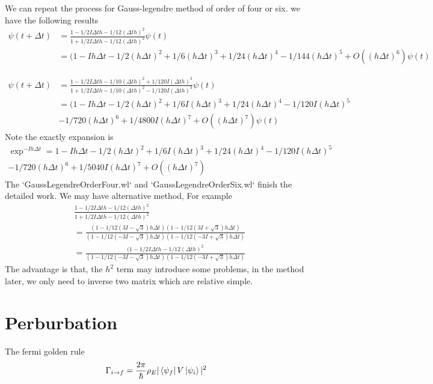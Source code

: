 \documentclass[12pt,twoside]{article}
\begin{document}
We can repeat the process for Gauss-legendre method of order of four or six. we have the following results
\begin{align*}
\psi(t + \Delta t) &= \frac{1 - 1/2 I \Delta t h - 1/12 (\Delta t h)^2}{ 1 + 1/2 I \Delta t h - 1/12 (\Delta t h)^2} \psi(t)\\
&=(1 - I h \Delta t - 1/2 (h \Delta t)^2 + 1/6 (h \Delta t)^3 + 1/24(h \Delta t)^4 - 1/144(h \Delta t)^5 + O((h \Delta t)^6)\psi(t)
\end{align*}

\begin{align*}
\psi(t + \Delta t) &= \frac{1 - 1/2 I \Delta t h - 1/10 (\Delta t h)^2 + 1/120 I (\Delta t h)^3}{ 1 + 1/2 I \Delta t h - 1/10 (\Delta t h)^2 - 1/120 I (\Delta t h)^3} \psi(t)\\
&=(1 - I h \Delta t - 1/2 (h \Delta t)^2 + 1/6 I(h \Delta t)^3 + 1/24(h \Delta t)^4 - 1/120I(h \Delta t)^5\\
&-1/720(h \Delta t)^6 + 1/4800I(h \Delta t)^7+ O((h \Delta t)^7)\psi(t)
\end{align*}
Note the exactly expansion is
\begin{multline}
\exp^{-Ih\Delta t} = 1 - I h \Delta t - 1/2 (h \Delta t)^2 + 1/6 I(h \Delta t)^3 + 1/24(h \Delta t)^4 - 1/120I(h \Delta t)^5\\
-1/720(h \Delta t)^6 + 1/5040I(h \Delta t)^7+ O((h \Delta t)^7)
\end{multline}
The `GaussLegendreOrderFour.wl` and  `GaussLegendreOrderSix.wl` finish the detailed work.
We may have alternative method, For example
\begin{align*}
&\frac{1 - 1/2 I \Delta t h - 1/12 (\Delta t h)^2}{ 1 + 1/2 I \Delta t h - 1/12 (\Delta t h)^2}\\
&=\frac{(1-1/12(3I-\sqrt{3})h \Delta t)(1-1/12(3I+\sqrt{3})h \Delta t)}{(1-1/12(-3I-\sqrt{3})h \Delta t)(1-1/12(-3I+\sqrt{3})h \Delta t)}\\
&=\frac{(1 - 1/2 I \Delta t h - 1/12 (\Delta t h)^2}{(1-1/12(-3I-\sqrt{3})h \Delta t)(1-1/12(-3I+\sqrt{3})h \Delta t)}
\end{align*}
The advantage is that, the $h^2$ term may introduce some problems, in the method later, we only need to inverse two matrix which are relative simple.

\section{Perburbation}

The fermi golden rule
$$
\Gamma_{i\rightarrow f} = \frac{2\pi}{\hbar} \rho_E |\bra{\psi_f}V\ket{\psi_i}|^2
$$
\end{document}
